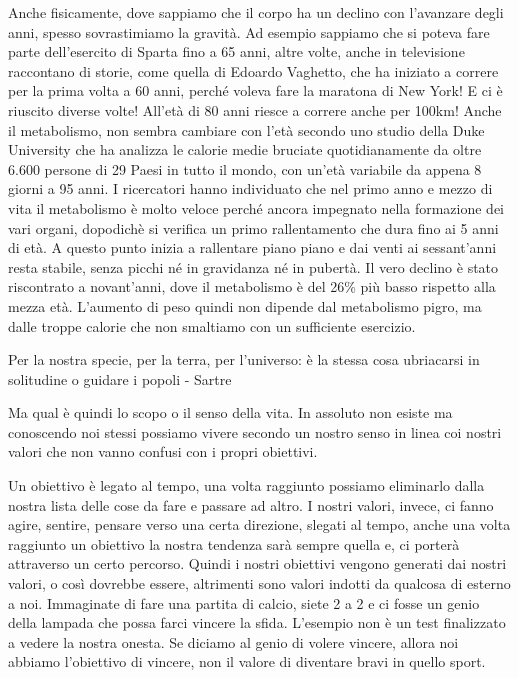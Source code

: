 \documentclass[12pt]{book} %
\begin{document}
\begin{mdframed}[linewidth=1pt]
\bigskip

Anche fisicamente, dove sappiamo che il corpo ha un declino con l'avanzare degli anni, spesso
sovrastimiamo la gravità. Ad esempio sappiamo che si poteva fare parte dell'esercito di Sparta fino a 65
anni, altre volte, anche in televisione raccontano di
storie, come quella di \newline
Edoardo
Vaghetto, che ha iniziato a correre per la prima volta a 60 anni, perché voleva fare la maratona di New York! E ci è riuscito
diverse volte! All'età di 80 anni riesce a correre anche per 100km! Anche il metabolismo, non
sembra cambiare con l'età secondo uno studio della Duke
University che ha analizza le calorie medie bruciate
quotidianamente da oltre 6.600 persone di 29 Paesi in tutto il mondo, con un'età variabile da appena 8 giorni a 95
anni. I ricercatori hanno individuato che nel primo anno e mezzo di vita il metabolismo è molto veloce perché ancora
impegnato nella formazione dei vari organi, dopodichè si verifica un primo rallentamento che dura fino ai 5 anni di
età. A questo punto inizia a rallentare piano piano e dai venti ai sessant'anni resta stabile, senza picchi né in
gravidanza né in pubertà. Il vero declino è stato riscontrato a novant'anni, dove il metabolismo è del 26\% più basso
rispetto alla mezza età. L{}'aumento di peso quindi non dipende dal metabolismo pigro, ma dalle troppe calorie che non
smaltiamo con un sufficiente esercizio.
\end{mdframed}

\bigskip

Per la nostra specie, per la terra, per l'universo: è la stessa cosa ubriacarsi in solitudine o
guidare i popoli - Sartre 


\bigskip

Ma qual è quindi lo scopo o il senso della vita. In assoluto non esiste ma conoscendo noi stessi possiamo vivere secondo
un nostro senso in linea coi nostri valori che non vanno confusi con i propri obiettivi.

Un obiettivo è legato al tempo, una volta raggiunto possiamo eliminarlo dalla nostra lista delle cose da fare e passare
ad altro. I nostri valori, invece, ci fanno agire, sentire, pensare verso una certa direzione, slegati al tempo, anche
una volta raggiunto un obiettivo la nostra tendenza sarà sempre quella e, ci porterà attraverso un certo percorso.
Quindi i nostri obiettivi vengono generati dai nostri valori, o così dovrebbe essere, altrimenti sono valori indotti da
qualcosa di esterno a noi. Immaginate di fare una partita di calcio, siete 2 a 2 e ci fosse un genio della lampada che
possa farci vincere la sfida. L'esempio non è un test finalizzato a vedere la nostra onesta. Se diciamo al genio di
volere vincere, allora noi abbiamo l'obiettivo di vincere, non il valore di diventare bravi in
quello sport.
\end{document}
